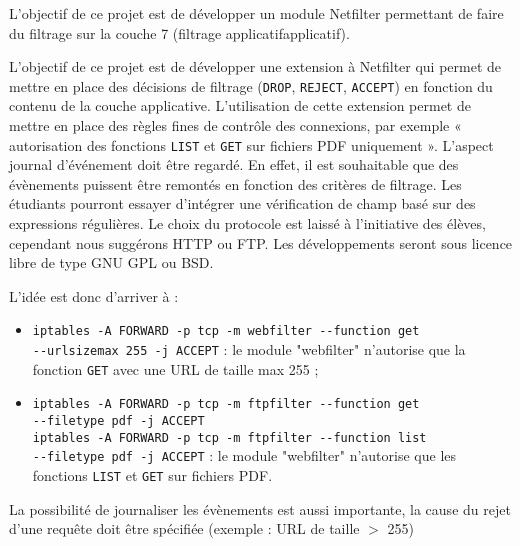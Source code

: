L'objectif de ce projet est de développer un module Netfilter permettant de faire du filtrage sur la couche 7 (filtrage applicatifapplicatif).

L'objectif de ce projet est de développer une extension à Netfilter qui permet de mettre en place des décisions de filtrage (\verb+DROP+, \verb+REJECT+, \verb+ACCEPT+) en fonction du contenu de la couche applicative. L’utilisation de cette extension permet de mettre en place des règles fines de contrôle des connexions, par exemple « autorisation des fonctions \verb+LIST+ et \verb+GET+ sur fichiers PDF uniquement ». L’aspect journal d’événement doit être regardé. En effet, il est souhaitable que des évènements puissent être remontés en fonction des critères de filtrage. Les étudiants pourront essayer d’intégrer une vérification de champ basé sur des expressions régulières.
Le choix du protocole est laissé à l’initiative des élèves, cependant nous suggérons HTTP ou FTP.
Les développements seront sous licence libre de type GNU GPL ou BSD.

L'idée est donc d'arriver à :
\begin{itemize}
\item \verb+iptables -A FORWARD -p tcp -m webfilter --function get+\\ \verb+--urlsizemax 255 -j ACCEPT+ : le module "webfilter" n'autorise que la fonction \verb+GET+ avec une URL de taille max 255 ;
\item \verb+iptables -A FORWARD -p tcp -m ftpfilter --function get+\\
\verb+--filetype pdf -j ACCEPT+\\
\verb+iptables -A FORWARD -p tcp -m ftpfilter --function list+\\
\verb+--filetype pdf -j ACCEPT+ : le module "webfilter" n'autorise que les fonctions \verb+LIST+ et \verb+GET+ sur fichiers PDF.
\end{itemize}

La possibilité de journaliser les évènements est aussi importante, la cause du rejet d'une requête doit être spécifiée (exemple : URL de taille $>$ 255) 
